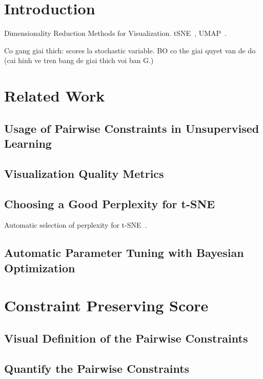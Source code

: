 \section{Introduction}

Dimensionality Reduction Methods for Visualization.
tSNE~\cite{maaten2008tsne}, UMAP~\cite{mcinnes2018umap}.

Co gang giai thich: scores la stochastic variable.
BO co the giai quyet van de do (cai hinh ve tren bang de giai thich voi ban G.)

\section{Related Work}

\subsection{Usage of Pairwise Constraints in Unsupervised Learning}


\subsection{Visualization Quality Metrics}


\subsection{Choosing a Good Perplexity for t-SNE}
Automatic selection of perplexity for t-SNE~\cite{cao2017automatic}.


\subsection{Automatic Parameter Tuning with Bayesian Optimization}


\section{Constraint Preserving Score}


\subsection{Visual Definition of the Pairwise Constraints}

\subsection{Quantify the Pairwise Constraints}

